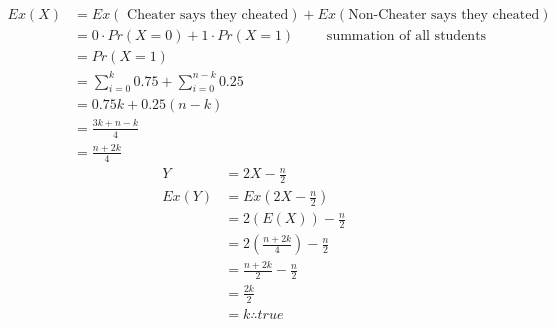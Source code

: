 \documentclass{article}
\begin{document}
\begin{enumerate}
		\begin{align*}
			Ex(X) &= Ex(\text{ Cheater says they cheated}) + Ex(\text{Non-Cheater says they cheated}) \\
			&= 0 \cdot Pr(X = 0) + 1 \cdot Pr(X = 1) \qquad \text{ summation of all students} \\
			&= Pr(X = 1) \\
			&= \sum_{i = 0}^{k} 0.75 + \sum_{i = 0}^{n - k} 0.25 \\
			&= 0.75 k + 0.25(n - k) \\
			&= \frac{3k + n - k}{4} \\
			&= \frac{n + 2k}{4}
		\end{align*}
		\begin{align*}
			Y &= 2X - \frac{n}{2} \\
			Ex(Y) &= Ex(2X - \frac{n}{2}) \\
			&= 2(E(X)) - \frac{n}{2} \\
			&= 2(\frac{n + 2k}{4}) - \frac{n}{2} \\
			&= \frac{n + 2k}{2} - \frac{n}{2} \\
			&= \frac{2k}{2} \\
			&= k \therefore true
		\end{align*}
	\end{enumerate}	
\end{document}
